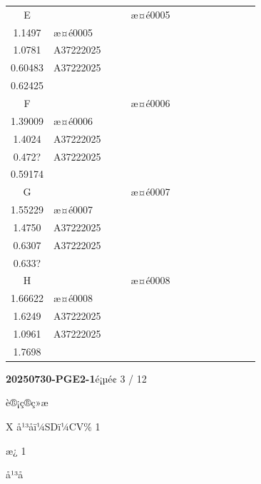 \documentclass[UTF8,10pt,a4paper,fontset=fandol]{ctexart}
\begin{document}
\begin{tabularx}{\textwidth}{c|*{12}{>{\centering\arraybackslash}X}}
E
& & & &
\scriptsize æ¤é0005\\[-2pt]\scriptsize 1.1497
&
\scriptsize æ¤é0005\\[-2pt]\scriptsize 1.0781
&
\scriptsize A37222025\\[-2pt]\scriptsize 0.60483
&
\scriptsize A37222025\\[-2pt]\scriptsize 0.62425
& & & & & \\ \hline
F
& & & &
\scriptsize æ¤é0006\\[-2pt]\scriptsize 1.39009
&
\scriptsize æ¤é0006\\[-2pt]\scriptsize 1.4024
&
\scriptsize A37222025\\[-2pt]\scriptsize 0.472? 
&
\scriptsize A37222025\\[-2pt]\scriptsize 0.59174
& & & & & \\ \hline
G
& & & &
\scriptsize æ¤é0007\\[-2pt]\scriptsize 1.55229
&
\scriptsize æ¤é0007\\[-2pt]\scriptsize 1.4750
&
\scriptsize A37222025\\[-2pt]\scriptsize 0.6307
&
\scriptsize A37222025\\[-2pt]\scriptsize 0.633? 
& & & & & \\ \hline
H
& & & &
\scriptsize æ¤é0008\\[-2pt]\scriptsize 1.66622
&
\scriptsize æ¤é0008\\[-2pt]\scriptsize 1.6249
&
\scriptsize A37222025\\[-2pt]\scriptsize 1.0961
&
\scriptsize A37222025\\[-2pt]\scriptsize 1.7698
& & & & & \\ \hline
\end{tabularx}

\normalsize


\newpage

\begin{center}
\textbf{20250730-PGE2-1}\hfill é¡µé¢ 3 / 12

\medskip
è®¡ç®ç»æ

X å¹³åï¼SDï¼CV\% 1

\medskip
æ¿ 1

å¹³å
\end{center}
\end{document}
